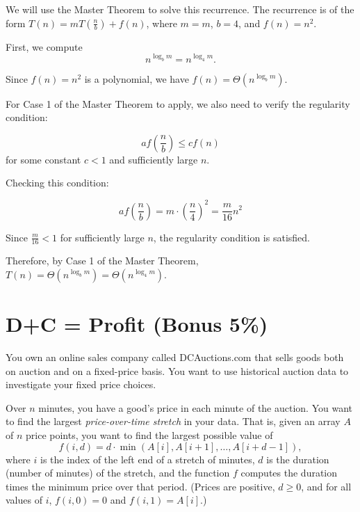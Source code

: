\documentclass[11pt,fleqn]{exam}
\newenvironment{soln}{\color{solnblue}}{}
\newif\ifsolutions\solutionsfalse
\begin{document}
\begin{questions}
    \begin{soln}
        We will use the Master Theorem to solve this recurrence.
        The recurrence is of the form $T(n) = mT\left( \frac{n}{b} \right) + f(n)$, where $m = m$, $b = 4$, and $f(n) = n^2$.

        First, we compute
        \[n^{\log_b m} = n^{\log_4 m}.\]

        Since $f(n) = n^2$ is a polynomial, we have $f(n) = \Theta(n^{\log_b m})$.

        For Case 1 of the Master Theorem to apply, we also need to verify the regularity condition:

        \[af\left(\frac{n}{b}\right) \leq cf(n)\] for some constant $c < 1$ and sufficiently large $n$.

        Checking this condition:

        \[af\left(\frac{n}{b}\right) = m \cdot \left(\frac{n}{4}\right)^2 = \frac{m}{16}n^2\]

        Since $\frac{m}{16} < 1$ for sufficiently large $n$, the regularity condition is satisfied.

        Therefore, by Case 1 of the Master Theorem, $T(n) = \Theta(n^{\log_b m}) = \Theta(n^{\log_4 m})$.
    \end{soln}

    \ifsolutions\fi 

\end{questions}

\clearpage

\section{D+C = Profit (Bonus 5\%)}
You own an online sales company called DCAuctions.com that sells goods both on auction and on a fixed-price basis. You want to use historical auction data to investigate your fixed price choices.
	
	Over $n$ minutes, you have a good's price in each minute of the auction. You want to find the largest \textit{price-over-time stretch} in your data. That is, given an array $A$ of $n$ price points, you want to find the largest possible value of
	$$
	f(i,d) = d \cdot \min(A[i], A[i+1], \ldots, A[i+d-1]),
	$$
	where $i$ is the index of the left end of a stretch of minutes, $d$ is the duration (number of minutes) of the stretch, and the function $f$ computes the duration times the minimum price over that period. (Prices are positive, $d \ge 0$, and for all values of $i$, $f(i,0) = 0$ and $f(i,1) = A[i]$.)
	
\end{document}
